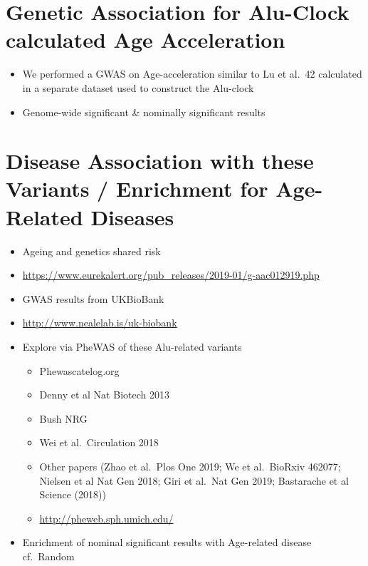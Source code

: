 \documentclass[
]{book}
\providecommand{\tightlist}{%
  \setlength{\itemsep}{0pt}\setlength{\parskip}{0pt}}
\begin{document}
\hypertarget{genetic-association-for-alu-clock-calculated-age-acceleration}{%
\section{Genetic Association for Alu-Clock calculated Age Acceleration}\label{genetic-association-for-alu-clock-calculated-age-acceleration}}

\begin{itemize}
\tightlist
\item
  We performed a GWAS on Age-acceleration similar to Lu et al.~42 calculated in a separate dataset used to construct the Alu-clock
\item
  Genome-wide significant \& nominally significant results
\end{itemize}

\hypertarget{disease-association-with-these-variants-enrichment-for-age-related-diseases}{%
\section{Disease Association with these Variants / Enrichment for Age-Related Diseases}\label{disease-association-with-these-variants-enrichment-for-age-related-diseases}}

\begin{itemize}
\tightlist
\item
  Ageing and genetics shared risk \citep{Zenin2019}
\item
  \url{https://www.eurekalert.org/pub_releases/2019-01/g-aac012919.php}
\item
  GWAS results from UKBioBank
\item
  \url{http://www.nealelab.is/uk-biobank}
\item
  Explore via PheWAS of these Alu-related variants

  \begin{itemize}
  \tightlist
  \item
    Phewascatelog.org
  \item
    Denny et al Nat Biotech 2013 \citep{Denny2014}
  \item
    Bush NRG \citep{Bush2016}
  \item
    Wei et al.~Circulation 2018 \citep{Wei2018}
  \item
    Other papers (Zhao et al.~Plos One 2019; We et al.~BioRxiv 462077; Nielsen et al Nat Gen 2018; Giri et al.~Nat Gen 2019; Bastarache et al Science (2018))
  \item
    \url{http://pheweb.sph.umich.edu/}
  \end{itemize}
\item
  Enrichment of nominal significant results with Age-related disease cf.~Random
\end{itemize}
\end{document}
